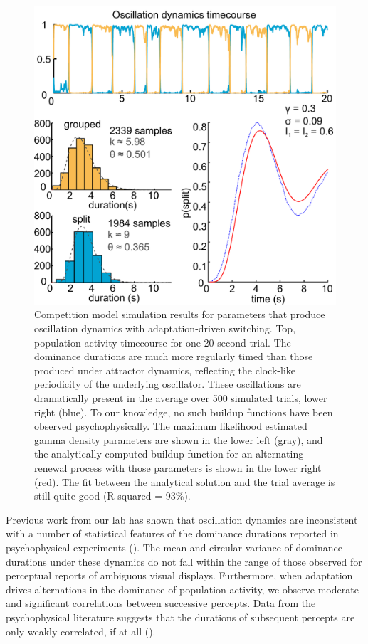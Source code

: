 \documentclass{frontiersSCNS} %
\begin{document}
\begin{figure}
		\centering
		
		\includegraphics[scale=.24]{hi_adapt_low_noise_equal_inputBUFsHists}
				
		\caption{Competition model simulation results for parameters that produce oscillation dynamics with adaptation-driven switching. Top, population activity timecourse for one 20-second trial. The dominance durations are much more regularly timed than those produced under attractor dynamics, reflecting the clock-like periodicity of the underlying oscillator. These oscillations are dramatically present in the average over 500 simulated trials, lower right (blue). To our knowledge, no such buildup functions have been observed psychophysically. The maximum likelihood estimated gamma density parameters are shown in the lower left (gray), and the analytically computed buildup function for an alternating renewal process with those parameters is shown in the lower right (red). The fit between the analytical solution and the trial average is still quite good (R-squared = 93\%).}
		\label{oscillation_dynamic_buildup}
\end{figure}


Previous work from our lab has shown that oscillation dynamics are inconsistent with a number of statistical features of the dominance durations reported in psychophysical experiments (\cite{Shpiro2009}). The mean and circular variance of dominance durations under these dynamics do not fall within the range of those observed for perceptual reports of ambiguous visual displays. Furthermore, when adaptation drives alternations in the dominance of population activity, we observe moderate and significant correlations between successive percepts. Data from the psychophysical literature suggests that the durations of subsequent percepts are only weakly correlated, if at all (\cite{Pressnitzer2006}).
\end{document}

